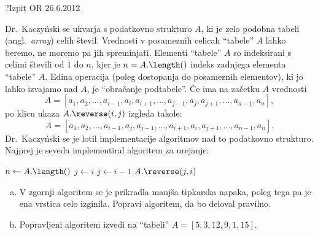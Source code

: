 \begin{naloga}{?}{Izpit OR 26.6.2012}
\begin{vprasanje}
Dr.~Kaczyński se ukvarja s podatkovno strukturo $A$,
ki je zelo podobna tabeli (angl.~{\em array}) celih števil.
Vrednosti v posameznih celicah ``tabele'' $A$ lahko beremo,
ne moremo pa jih spreminjati.
Elementi ``tabele'' $A$ so indeksirani s celimi števili od $1$ do $n$,
kjer je $n = A.\length()$ indeks zadnjega elementa ``tabele'' $A$.
Edina operacija (poleg dostopanja do posameznih elementov),
ki jo lahko izvajamo nad $A$, je ``obračanje podtabele''.
Če ima na začetku $A$ vrednosti
$$
A = [a_1, a_2, \dots, a_{i-1}, a_i, a_{i+1}, \dots, a_{j-1}, a_j, a_{j+1},
     \dots, a_{n-1}, a_n],
$$
po klicu ukaza $A.\reverse(i, j)$ izgleda takole:
$$
A = [a_1, a_2, \dots, a_{i-1}, a_j, a_{j-1}, \dots, a_{i+1}, a_i, a_{j+1},
     \dots, a_{n-1}, a_n] .
$$
Dr.~Kaczyński se je lotil implementacije algoritmov
nad to podatkovno strukturo.
Najprej je seveda implementiral algoritem za urejanje:
\begin{small}
\begin{algorithmic}
\State $n \gets A.\length()$
    \State $j \gets i$
        \State $j \gets i-1$
    \EndWhile
    \State $A.\reverse(j, i)$
        \State
    \EndIf
\EndFor
\end{algorithmic}
\end{small}

\begin{enumerate}[(a)]
\item V zgornji algoritem se je prikradla manjša tipkarska napaka,
poleg tega pa je ena vrstica celo izginila.
Popravi algoritem, da bo deloval pravilno.

\item Popravljeni algoritem izvedi na ``tabeli'' $A = [5, 3, 12, 9, 1, 15]$.
\end{enumerate}
\end{vprasanje}
\begin{odgovor}
\end{odgovor}
\end{naloga}
